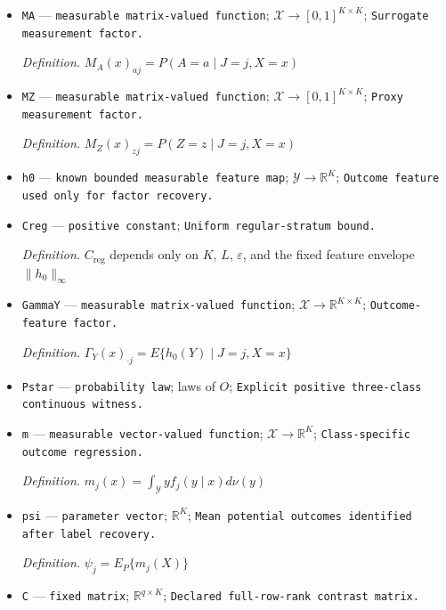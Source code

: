 \documentclass{article}
\begin{document}
\begin{itemize}
  \par\smallskip\noindent\emph{Definition.} \(f_j(y\mid x)=dP(Y\in dy\mid J=j,X=x)/d\nu(y)\)
  \item \texttt{MA} --- \texttt{measurable matrix-\allowbreak{}valued function}; \(\mathcal X\to[0,1]^{K\times K}\); \texttt{Surrogate measurement factor.}
  \par\smallskip\noindent\emph{Definition.} \(M_A(x)_{aj}=P(A=a\mid J=j,X=x)\)
  \item \texttt{MZ} --- \texttt{measurable matrix-\allowbreak{}valued function}; \(\mathcal X\to[0,1]^{K\times K}\); \texttt{Proxy measurement factor.}
  \par\smallskip\noindent\emph{Definition.} \(M_Z(x)_{zj}=P(Z=z\mid J=j,X=x)\)
  \item \texttt{h0} --- \texttt{known bounded measurable feature map}; \(\mathcal Y\to\mathbb R^{K}\); \texttt{Outcome feature used only for factor recovery.}
  \item \texttt{Creg} --- \texttt{positive constant}; \texttt{Uniform regular-\allowbreak{}stratum bound.}
  \par\smallskip\noindent\emph{Definition.} \(C_{\mathrm{reg}}\) depends only on \(K\), \(L\), \(\varepsilon\), and the fixed feature envelope \(\|h_0\|_{\infty}\)
  \item \texttt{GammaY} --- \texttt{measurable matrix-\allowbreak{}valued function}; \(\mathcal X\to\mathbb R^{K\times K}\); \texttt{Outcome-\allowbreak{}feature factor.}
  \par\smallskip\noindent\emph{Definition.} \(\Gamma_Y(x)_{\cdot j}=E\{h_0(Y)\mid J=j,X=x\}\)
  \item \texttt{Pstar} --- \texttt{probability law}; laws of \(O\); \texttt{Explicit positive three-\allowbreak{}class continuous witness.}
  \item \texttt{m} --- \texttt{measurable vector-\allowbreak{}valued function}; \(\mathcal X\to\mathbb R^{K}\); \texttt{Class-\allowbreak{}specific outcome regression.}
  \par\smallskip\noindent\emph{Definition.} \(m_j(x)=\int_{\mathcal Y}y f_j(y\mid x)d\nu(y)\)
  \item \texttt{psi} --- \texttt{parameter vector}; \(\mathbb R^{K}\); \texttt{Mean potential outcomes identified after label recovery.}
  \par\smallskip\noindent\emph{Definition.} \(\psi_j=E_P\{m_j(X)\}\)
  \item \texttt{C} --- \texttt{fixed matrix}; \(\mathbb R^{q\times K}\); \texttt{Declared full-\allowbreak{}row-\allowbreak{}rank contrast matrix.}

\end{itemize}
\end{document}
